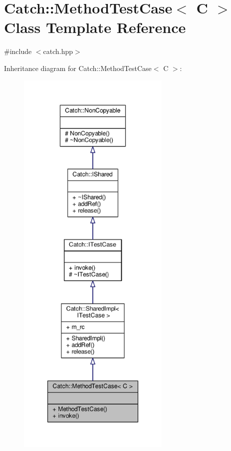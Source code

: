 \hypertarget{class_catch_1_1_method_test_case}{\section{Catch\-:\-:Method\-Test\-Case$<$ C $>$ Class Template Reference}
\label{class_catch_1_1_method_test_case}
}


{\ttfamily \#include $<$catch.\-hpp$>$}



Inheritance diagram for Catch\-:\-:Method\-Test\-Case$<$ C $>$\-:
\nopagebreak
\begin{figure}[H]
\begin{center}
\leavevmode
\includegraphics[height=550pt]{class_catch_1_1_method_test_case__inherit__graph}
\end{center}
\end{figure}


